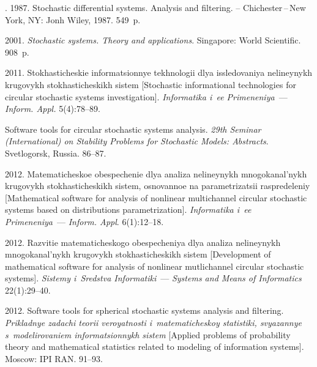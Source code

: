   \begin{multicols}{2}

\renewcommand{\bibname}{\protect\rmfamily References}

{\small\frenchspacing
 {%
 \begin{thebibliography}{99}

. 1987.
Stochastic differential systems. Analysis
and filtering. -- Chichester\,--\,New York, NY: Jonh Wiley, 1987. 549~p.

 2001.  \textit{Stochastic systems. Theory and  applications}.
Singapore: World Scientific. 908~p.


 2011.  Stokhasticheskie informatsionnye 
tekhnologii dlya issledovaniya nelineynykh krugovykh stokhasticheskikh sistem 
[Stochastic informational technologies for circular stochastic systems investigation]. 
\textit{Informatika i~ee Primeneniya}~--- \textit{Inform. Appl.} 5(4):78--89.

Software tools for circular stochastic systems analysis. 
\textit{29th Seminar (International) on Stability Problems 
for Stochastic Models: Abstracts}. Svetlogorsk, Russia. 86--87.


 2012.
Matematicheskoe obespechenie dlya analiza nelineynykh mnogokanal'nykh krugovykh 
stokhasticheskikh sistem, osnovannoe na parametri\-za\-tsii raspredeleniy 
[Mathematical software for analysis of nonlinear multichannel circular stochastic 
systems based on distributions parametrization]. 
\textit{Informatika i~ee Primeneniya}~--- \textit{Inform. Appl}. 6(1):12--18.

  2012.
Razvitie matematicheskogo obespecheniya dlya analiza nelineynykh mno\-go\-ka\-nal'\-nykh 
krugovykh stokhasticheskikh sistem [Development of mathematical software for 
analysis of nonlinear mutlichannel circular stochastic systems]. 
\textit{Sistemy i~Sredstva Informatiki}~--- \textit{Systems and Means of Informatics}
 22(1):29--40.

  2012.
Software tools for spherical stochastic systems analysis and filtering.  
\textit{Prikladnye zadachi teorii ve\-ro\-yat\-nosti i~matematicheskoy statistiki, svyazannye 
s~modelirovaniem informatsionnykh sistem}
[Applied problems of probability theory and mathematical
statistics related to modeling
of information systems]. Moscow:   IPI RAN. 91--93.


\end{thebibliography}}}
\end{multicols}
